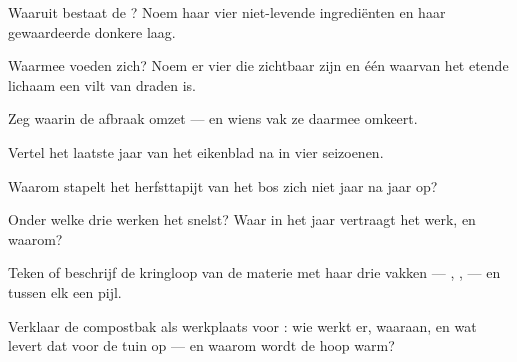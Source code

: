 \begin{exercise}[$\star$]\label{exo:g6:decomposers-and-soil:1}
Waaruit bestaat de ? Noem haar vier niet-levende ingrediënten en
haar gewaardeerde donkere laag.
\end{exercise}

\begin{exercise}[$\star$]\label{exo:g6:decomposers-and-soil:2}
Waarmee voeden  zich? Noem er vier die zichtbaar zijn en één
waarvan het etende lichaam een vilt van draden is.
\end{exercise}

\begin{exercise}[$\star$]\label{exo:g6:decomposers-and-soil:3}
Zeg waarin de afbraak  omzet --- en wiens vak ze
daarmee omkeert.
\end{exercise}

\begin{exercise}[$\star$]\label{exo:g6:decomposers-and-soil:4}
Vertel het laatste jaar van het eikenblad na in vier seizoenen.
\end{exercise}

\begin{exercise}[$\star$]\label{exo:g6:decomposers-and-soil:5}
Waarom stapelt het herfsttapijt van het bos zich niet jaar na jaar op?
\end{exercise}

\begin{exercise}[$\star$]\label{exo:g6:decomposers-and-soil:6}
Onder welke drie  werken  het snelst? Waar in het
jaar vertraagt het werk, en waarom?
\end{exercise}

\begin{exercise}[$\star\star$]\label{exo:g6:decomposers-and-soil:7}
Teken of beschrijf de kringloop van de materie met haar drie vakken ---
, ,  --- en tussen elk een pijl.
\end{exercise}

\begin{exercise}[$\star\star$]\label{exo:g6:decomposers-and-soil:8}
Verklaar de compostbak als werkplaats voor : wie werkt er,
waaraan, en wat levert dat voor de tuin op --- en waarom wordt de hoop
warm?
\end{exercise}

